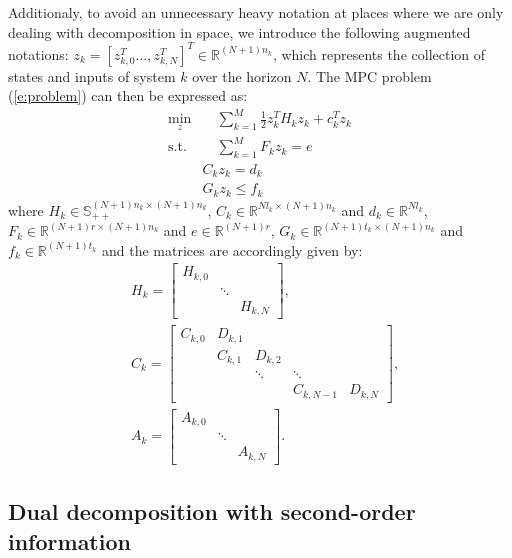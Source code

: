 Additionaly, to avoid an unnecessary heavy notation at places where we are only dealing with decomposition in space, we introduce the following augmented notations: $z_k = [z_{k,0}^T \dots, z_{k,N}^T]^T \in \mathbb{R}^{(N+1)n_k}$, which represents the collection of states and inputs of system $k$ over the horizon $N$. The MPC problem (\ref{e:problem}) can then be expressed as:
\begin{subequations}
\label{e:problem1}
\begin{align}
\min_z & \quad \sum_{k=1}^{M} \frac{1}{2}z_k^TH_k z_k + c_k^Tz_k \label{e:1} \\
\text{s.t.} & \quad \sum_{k=1}^{M} F_k z_k = e \label{e:CoupConst} \\
& C_k z_k = d_k \label{e:3} \\
& G_k z_k \leq f_k \label{e:ineqConst}
\end{align}
\end{subequations}
where $H_{k} \in \mathbb{S}_{++}^{(N+1)n_{k} \times (N+1)n_{k}}$, $C_{k} \in \mathbb{R}^{N l_{k} \times (N+1)n_{k}}$ and $d_{k} \in \mathbb{R}^{N l_{k}}$, $F_{k} \in \mathbb{R}^{(N+1) r \times (N+1) n_{k}}$ and $e \in \mathbb{R}^{(N+1)r}$, $G_{k} \in \mathbb{R}^{(N+1) t_{k} \times (N+1) n_{k}}$ and $f_{k} \in \mathbb{R}^{(N+1) t_{k}}$ and the matrices are accordingly given by:
\begin{subequations}
\begin{align*}
& H_k = \left[ \begin{array}{ccc}
H_{k,0} & & \\
 & \ddots & \\
 & & H_{k,N}
\end{array} \right], \\
& C_k = \left[ \begin{array}{ccccc} 
C_{k,0} & D_{k,1} &  &   &  \\
 & C_{k,1} & D_{k,2} &  &  \\
 &  & \ddots & \ddots &  \\
 &  &  & C_{k,N-1} & D_{k,N}
\end{array} \right], \\
& A_k = \left[ \begin{array}{ccc}
A_{k,0} & & \\
 & \ddots & \\
 & & A_{k,N}
\end{array} \right].
\end{align*}
\end{subequations}

\subsection{Dual decomposition with second-order information}

